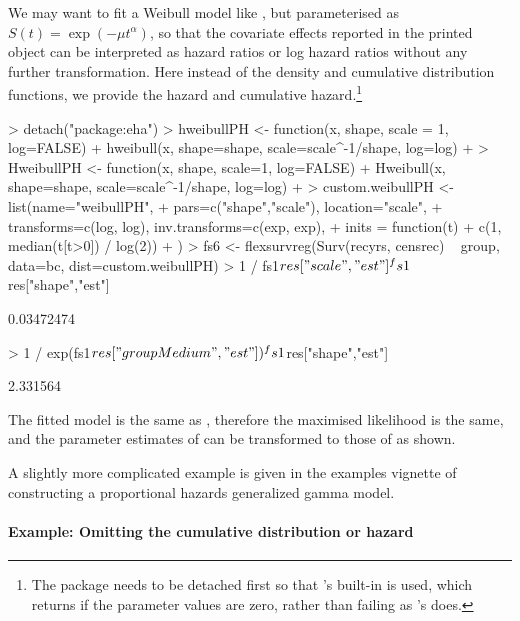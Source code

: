 \documentclass[nojss,nofooter]{jss}
\begin{document}
We may want to fit a Weibull model like , but parameterised as $S(t) =
\exp(-\mu t^\alpha)$, so that the covariate effects reported in the
printed  object can be interpreted as hazard ratios
or log hazard ratios without any further transformation.
Here instead of the density and cumulative distribution functions, we
provide the hazard and cumulative hazard.\footnote{The  package 
needs to be detached first so that 's built-in  is used, which returns  if the parameter values are zero, rather than failing as 's does.}
\begin{Schunk}
\begin{Sinput}
> detach("package:eha")
> hweibullPH <- function(x, shape, scale = 1, log=FALSE){
+     hweibull(x, shape=shape, scale=scale^{-1/shape}, log=log)
+ }
> HweibullPH <- function(x, shape, scale=1, log=FALSE){
+     Hweibull(x, shape=shape, scale=scale^{-1/shape}, log=log)
+ }
> custom.weibullPH <- list(name="weibullPH", 
+                          pars=c("shape","scale"), location="scale",
+                          transforms=c(log, log), inv.transforms=c(exp, exp),
+                          inits = function(t){
+                              c(1, median(t[t>0]) / log(2))
+                          })
> fs6 <- flexsurvreg(Surv(recyrs, censrec) ~ group, data=bc, dist=custom.weibullPH)
> 1 / fs1$res["scale","est"]^fs1$res["shape","est"]
\end{Sinput}
\begin{Soutput}
[1] 0.03472474
\end{Soutput}
\begin{Sinput}
> 1 / exp(fs1$res["groupMedium","est"]) ^ fs1$res["shape","est"]
\end{Sinput}
\begin{Soutput}
[1] 2.331564
\end{Soutput}
\end{Schunk}
The fitted model is the same as , therefore the maximised likelihood is the same,
and the parameter estimates of  can be transformed to those of  as shown.

A slightly more complicated example is given in the examples vignette
of constructing a proportional hazards generalized gamma model.


\paragraph{Example: Omitting the cumulative distribution or hazard}
\end{document}
